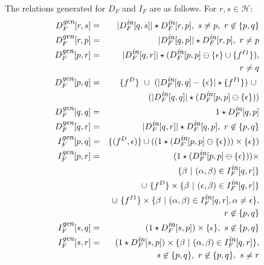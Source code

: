 \documentclass{sig-alternate}
\newcommand{\p}{\ensuremath{p}}
\newcommand{\q}{\ensuremath{q}}
\newcommand{\s}{\ensuremath{s}}
\newcommand{\myr}{\ensuremath{r}}
\newcommand{\drct}{\ensuremath{D}}
\newcommand{\indrct}{\ensuremath{I}}
\newcommand{\heap}{\ensuremath{\mathcal{H}}}
\newcommand{\epsilonset}{\ensuremath{\{\epsilon\}}}
\newcommand{\din}{\mbox{\footnotesize\em in}}
\newcommand{\dgen}{\mbox{\footnotesize\em gen}}
\newcommand{\num}[1]{\ensuremath{|#1|}}
\newcommand{\remOne}[2]{\ensuremath{#1 \ominus #2}}
\newcommand{\fieldD}[2]{\ensuremath{{#1}_{#2}^\drct}}
\newcommand{\fieldI}[3]{\ensuremath{{#1}_{#2}^{\indrct#3}}}
\begin{document}
\begin{enumerate}
The relations generated for $D_F$ and $I_F$ are as follows. 
For $\myr, \s \in \heap$:
\begin{eqnarray*}
  D_F^{\dgen}[\myr, \s] &=& \num{D_F^{\din}[\q, \s]} \star
  D_F^{\din}[\myr, \p],\ \s \not= \p,\ \myr \not\in
  \{\p, \q\}\\ 
  D_F^{\dgen}[\myr, \p] &=& \num{D_F^{\din}[\q,\p]} \star
  D_F^{\din}[\myr, \p], \ \myr \not= \p\\
 D_F^{\dgen}[\p, \myr] &=& \num{D_F^{\din}[\q, \myr]} \star
 (\remOne{D_F^{\din}[\p, \p]}{\epsilonset} \cup \{f^{\indrct
   1}\}),\\ 
   && \qquad \qquad \myr \not= \q \\ 
  D_F^{\dgen}[\p, \q] &=&
  \{\fieldD{f}{}\}\ \cup\ (\num{D_F^{\din}[\q, \q] -
    \epsilonset} \star
  \{\fieldI{f}{}{1}\})\ \cup\ \\
  && (\num{D_F^{\din}[\q, \q]} \star ( \remOne{D_F^{\din}[\p, \p]}{\epsilonset})) \\ 
  D_F^{\dgen}[\q, \q] &=& 1 \star D_F^{\din}[\q, \p] \\
  D_F^{\dgen}[\q, \myr] &=& \num{D_F^{\din}[\q, \myr]} \star
  D_F^{\din}[\q, \p],\ \myr \not\in \{\p,
  \q\} \\ 
  I_F^{\dgen}[\p, \q] &=& \{(\fieldD{f}{}, \epsilon)\}
  \cup ((1 \star (\remOne{D_F^{\din}[\p,
      \p]}{\epsilonset})) \times \epsilonset) \\	 
  I_F^{\dgen}[\p, \myr] &=& 
  (1 \star (\remOne{D_F^{\din}[\p, \p]}{\epsilonset})) \times \\
  && \{\beta\ \vert\ (\alpha, \beta) \in I_F^{\din}[\q, \myr] \}
  \\
  && \cup\ \{f^\drct\} \times 
  \{\beta\ \vert\ (\epsilon, \beta) \in I_F^{\din}[\q, \myr] \}
  \\
  && \cup\ \{f^{\indrct 1}\} \times 
  \{\beta\ \vert\ (\alpha, \beta) \in I_F^{\din}[\q, \myr],
  \alpha \not= \epsilon \},\\ 
  && \qquad \qquad \myr \not\in \{\p, \q\} \\
  I_F^{\dgen}[\s, \q] &=& (1 \star D_F^{\din}[\s, \p]) \times
  \epsilonset,\ \s \not\in \{\p, \q\} \\ 
  I_F^{\dgen}[\s, \myr] &=& (1 \star D_F^{\din}[\s, \p])
  \times \{\beta\ \vert\ (\alpha, \beta) \in I_F^{\din}[\q,
    \myr]\},\\ 
	&& \qquad \qquad \s \not\in \{\p, \q\},\ \myr \not\in \{\p,
  \q\},\ \s \not= \myr 
\end{eqnarray*}


\end{enumerate}
\end{document}
